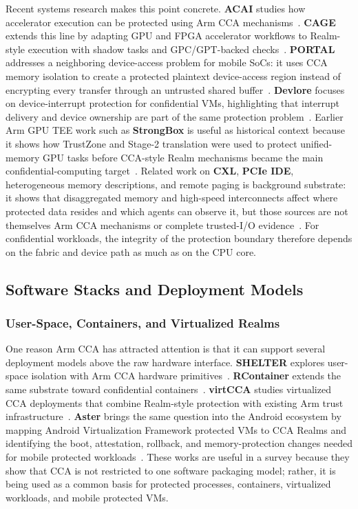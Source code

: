 Recent systems research makes this point concrete. \textbf{ACAI} studies how accelerator execution can be protected using Arm CCA mechanisms~\cite{acai2023}. \textbf{CAGE} extends this line by adapting GPU and FPGA accelerator workflows to Realm-style execution with shadow tasks and GPC/GPT-backed checks~\cite{wang2026cage}. \textbf{PORTAL} addresses a neighboring device-access problem for mobile SoCs: it uses CCA memory isolation to create a protected plaintext device-access region instead of encrypting every transfer through an untrusted shared buffer~\cite{sang2025portal}. \textbf{Devlore} focuses on device-interrupt protection for confidential VMs, highlighting that interrupt delivery and device ownership are part of the same protection problem~\cite{bertschi2026devlore}. Earlier Arm GPU TEE work such as \textbf{StrongBox} is useful as historical context because it shows how TrustZone and Stage-2 translation were used to protect unified-memory GPU tasks before CCA-style Realm mechanisms became the main confidential-computing target~\cite{deng2022strongbox}. Related work on \textbf{CXL}, \textbf{PCIe IDE}, heterogeneous memory descriptions, and remote paging is background substrate: it shows that disaggregated memory and high-speed interconnects affect where protected data resides and which agents can observe it, but those sources are not themselves Arm CCA mechanisms or complete trusted-I/O evidence~\cite{cxl_spec,pcie_ide,acpi_spec,gouk2022directcxl,zhong2024cxltiers,wang2025odrp}. For confidential workloads, the integrity of the protection boundary therefore depends on the fabric and device path as much as on the CPU core.

\subsection{Software Stacks and Deployment Models}

\subsubsection{User-Space, Containers, and Virtualized Realms}

One reason Arm CCA has attracted attention is that it can support several deployment models above the raw hardware interface. \textbf{SHELTER} explores user-space isolation with Arm CCA hardware primitives~\cite{zhang2023shelter}. \textbf{RContainer} extends the same substrate toward confidential containers~\cite{zhou2025rcontainer}. \textbf{virtCCA} studies virtualized CCA deployments that combine Realm-style protection with existing Arm trust infrastructure~\cite{xu2026virtcca}. \textbf{Aster} brings the same question into the Android ecosystem by mapping Android Virtualization Framework protected VMs to CCA Realms and identifying the boot, attestation, rollback, and memory-protection changes needed for mobile protected workloads~\cite{kuhne2026aster}. These works are useful in a survey because they show that CCA is not restricted to one software packaging model; rather, it is being used as a common basis for protected processes, containers, virtualized workloads, and mobile protected VMs.

